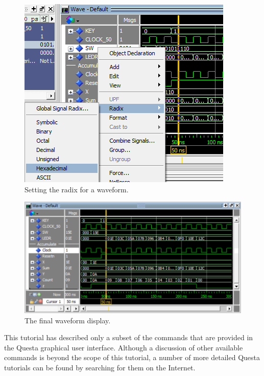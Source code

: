 \documentclass[11pt, twoside, pdftex]{article}
\newcommand{\commonPath}{../../../Common}
\begin{document}
\begin{figure}[h!]
	\begin{center}
		\includegraphics[scale=1.25]{figures/appa_fig12.png}
	\end{center}
		  \caption{Setting the radix for a waveform.}
	\label{fig:appa_fig12}
\end{figure}

\begin{figure}[h!]
	\begin{center}
		\includegraphics[scale=0.8]{figures/appa_fig13.png}
	\end{center}
		  \caption{The final waveform display.}
	\label{fig:appa_fig13}
\end{figure}

\noindent
This tutorial has described only a subset of the commands that are provided in the
Questa graphical user interface. Although a discussion of other available commands is 
beyond the scope of this tutorial, a number of more detailed Questa tutorials can be 
found by searching for them on the Internet.



\end{document}

